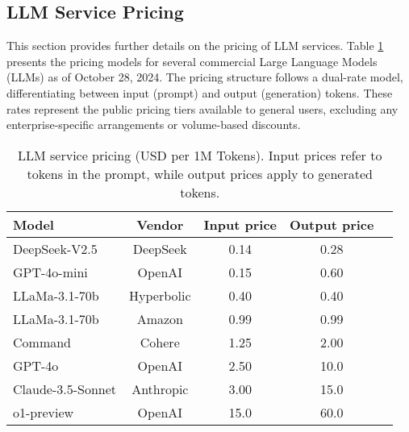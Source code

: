 \subsection{LLM Service Pricing}\label{appendix:llm_pricing}
This section provides further details on the pricing of LLM services. Table \ref{tab:model-pricing} presents the pricing models for several commercial Large Language Models (LLMs) as of October 28, 2024. The pricing structure follows a dual-rate model, differentiating between input (prompt) and output (generation) tokens. These rates represent the public pricing tiers available to general users, excluding any enterprise-specific arrangements or volume-based discounts.

\begin{table}[t]
    \centering
    \footnotesize
    \begin{tabularx}{\linewidth}{lcccc}
    \toprule
    \textbf{Model} & \textbf{Vendor} & \textbf{Input price} & \textbf{Output price} \\
    \midrule
    DeepSeek-V2.5     & DeepSeek   & 0.14 & 0.28 \\
    GPT-4o-mini       & OpenAI     & 0.15 & 0.60 \\
    LLaMa-3.1-70b     & Hyperbolic & 0.40 & 0.40 \\
    LLaMa-3.1-70b     & Amazon     & 0.99 & 0.99 \\
    Command           & Cohere     & 1.25 & 2.00 \\
    GPT-4o            & OpenAI     & 2.50 & 10.0 \\
    Claude-3.5-Sonnet & Anthropic  & 3.00 & 15.0 \\
    o1-preview        & OpenAI     & 15.0 & 60.0 \\
    \bottomrule
    \end{tabularx}
    \caption{LLM service pricing (USD per 1M Tokens). Input prices refer to tokens in the prompt, while output prices apply to generated tokens.}
    \label{tab:model-pricing}
\end{table}
